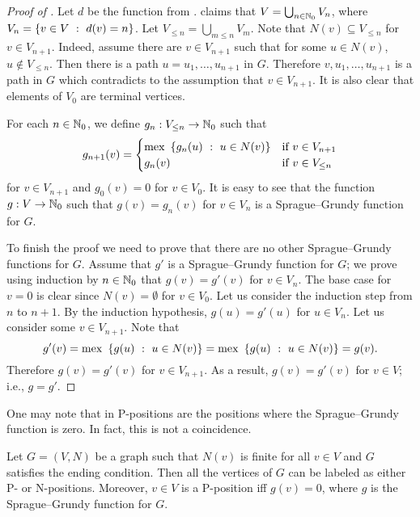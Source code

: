 \begin{proof}[Proof of ]
  Let $d$ be the function from .  claims
  that $V = \bigcup_{n \in {\mathbb{N}}_0} V_n$, where $V_n = \set[d(v) = n]{v \in V}$.
  Let $V_{\le n} = \bigcup_{m \le n} V_m$.
  Note that $N(v) \subseteq V_{\le n}$ for $v \in V_{n + 1}$. Indeed, assume
  there are $v \in V_{n + 1}$ such that for some $u \in N(v)$, 
  $u \not\in V_{\le n}$. Then there is a path $u = u_1, \dots, u_{n + 1}$ in
  $G$. Therefore $v, u_1, \dots, u_{n + 1}$ is a path in $G$ which contradicts
  to the assumption that $v \in V_{n + 1}$. It is also clear that elements of
  $V_0$ are terminal vertices.

  For each $n \in {\mathbb{N}}_0$, we define $g_n : V_{\le n} \to {\mathbb{N}}_0$ such that 
  \[
    g_{n + 1}(v) = 
    \begin{cases}
      \mex \set[u \in N(v)]{g_n(u)} & \text{if } v \in V_{n + 1} \\
      g_n(v) & \text{if } v \in V_{\le n}
    \end{cases}
  \]
  for $v \in V_{n + 1}$ and $g_0(v) = 0$ for $v \in V_0$. It is easy to see
  that the function $g : V \to {\mathbb{N}}_0$ such that $g(v) = g_n(v)$ for $v \in V_n$
  is a Sprague--Grundy function for $G$. 

  To finish the proof we need to prove that there are no other Sprague--Grundy
  functions for $G$. Assume that $g'$ is a Sprague--Grundy function for
  $G$; we prove using induction by $n \in {\mathbb{N}}_0$ that $g(v) = g'(v)$ for 
  $v \in V_n$. The base case for $v = 0$ is clear since $N(v) = \emptyset$ for
  $v \in V_0$. Let us consider the induction step from $n$ to $n + 1$. By the
  induction hypothesis, $g(u) = g'(u)$ for $u \in V_n$. Let us consider some $v
  \in V_{n + 1}$. Note that 
  \[
    g'(v) = \mex \set[u \in N(v)]{g(u)} = \mex \set[u \in N(v)]{g(u)} = g(v).
  \]
  Therefore $g(v) = g'(v)$ for $v \in V_{n + 1}$. As a result, $g(v) = g'(v)$
  for $v \in V$; i.e., $g = g'$.
\end{proof}

One may note that in  P-positions are the positions
where the Sprague--Grundy function is zero. In fact, this is not a coincidence.
\begin{theorem}
\label{theorem:grundy-to-np}
  Let $G = (V, N)$ be a graph such that $N(v)$ is finite for all $v \in V$ and 
  $G$ satisfies the ending condition. Then all the vertices of $G$ can be
  labeled as either P- or N-positions. Moreover, $v \in V$ is a P-position iff
  $g(v) = 0$, where $g$ is the Sprague--Grundy function for $G$.
\end{theorem}


